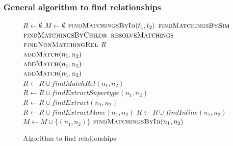 \subsubsection{General algorithm to find relationships}

\begin{figure}[htbp]
\small
\begin{algorithmic}[1]
\State $R \gets \emptyset$
\State $M \gets \emptyset$
\State $\textsc{findMatchingsById}(t_1,t_2)$
\State $\textsc{findMatchingsBySim}$
\State $\textsc{findMatchingsByChildr}$
\State $\textsc{resolveMatchings}$
\State $\textsc{findNonMatchingRel}$
\State \Return $R$
\\
    \State $\textsc{addMatch}(n_1, n_2)$
  \EndIf
\EndFor
\EndProcedure
\\
    \State $\textsc{addMatch}(n_1, n_2)$
  \EndIf  
\EndFor
\EndProcedure
\\
    \State $\textsc{addMatch}(n_1, n_2)$
  \EndIf
\EndFor
\EndProcedure
\\
  \State $R \gets R \cup \mathit{findMatchRel}(n_1, n_2)$
\EndFor
\EndProcedure
\\
  \State $R \gets R \cup \mathit{findExtractSupertype}(n_1, n_2)$
  \State $R \gets R \cup \mathit{findExtract}(n_1, n_2)$
  \State $R \gets R \cup \mathit{findExtractMove}(n_1, n_2)$
\EndFor
{}
  \State $R \gets R \cup \mathit{findInline}(n_1, n_2)$
\EndFor
\EndProcedure
\\
  \State $M \gets M \cup \{(n_1, n_2)\}$
  \State $\textsc{findMatchingsById}(n_1,n_2)$
\EndIf
\EndProcedure
\\
\EndProcedure
\end{algorithmic}
\caption{Algorithm to find relationships}
\label{AlgoGeneral}
\end{figure}
